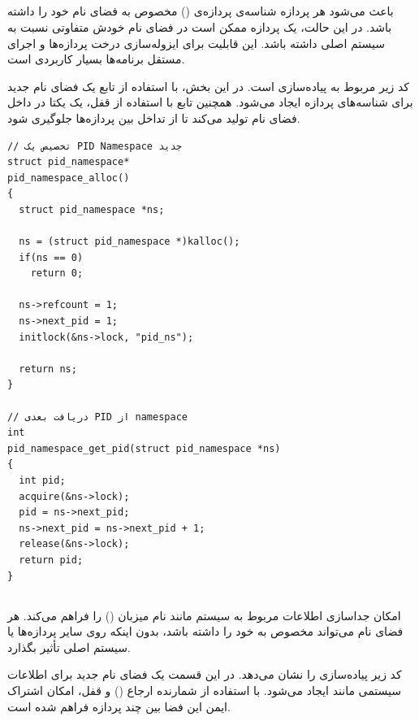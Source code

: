 \documentclass[12pt]{article}
\begin{document}
\subsection{}
 باعث می‌شود هر پردازه شناسه‌ی پردازه‌ی () مخصوص به فضای نام خود را داشته باشد. در این حالت، یک پردازه ممکن است در فضای نام خودش  متفاوتی نسبت به سیستم اصلی داشته باشد. این قابلیت برای ایزوله‌سازی درخت پردازه‌ها و اجرای مستقل برنامه‌ها بسیار کاربردی است.

کد زیر مربوط به پیاده‌سازی  است. در این بخش، با استفاده از تابع
\texttt{} یک فضای نام جدید برای شناسه‌های پردازه ایجاد می‌شود.
همچنین تابع \texttt{} با استفاده از قفل، یک  یکتا
در داخل فضای نام تولید می‌کند تا از تداخل بین پردازه‌ها جلوگیری شود.


\begin{LTR}
\begin{lstlisting}
// تخصیص یک PID Namespace جدید
struct pid_namespace*
pid_namespace_alloc()
{
  struct pid_namespace *ns;
  
  ns = (struct pid_namespace *)kalloc();
  if(ns == 0)
    return 0;
  
  ns->refcount = 1;
  ns->next_pid = 1;
  initlock(&ns->lock, "pid_ns");
  
  return ns;
}

// دریافت بعدی PID از namespace
int
pid_namespace_get_pid(struct pid_namespace *ns)
{
  int pid;
  acquire(&ns->lock);
  pid = ns->next_pid;
  ns->next_pid = ns->next_pid + 1;
  release(&ns->lock);
  return pid;
}
\end{lstlisting}
\end{LTR}

\subsection{}
 امکان جداسازی اطلاعات مربوط به سیستم مانند نام میزبان () را فراهم می‌کند. هر فضای نام  می‌تواند  مخصوص به خود را داشته باشد، بدون اینکه روی سایر پردازه‌ها یا سیستم اصلی تأثیر بگذارد.

کد زیر پیاده‌سازی  را نشان می‌دهد. در این قسمت یک فضای نام
جدید برای اطلاعات سیستمی مانند  ایجاد می‌شود. با استفاده از شمارنده
ارجاع () و قفل، امکان اشتراک ایمن این فضا بین چند پردازه فراهم شده است.
\end{document}
